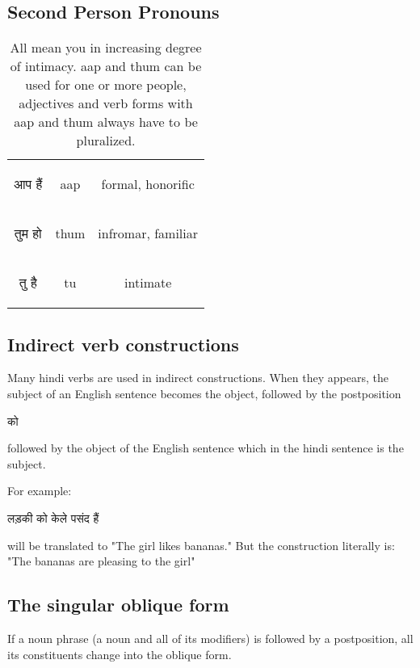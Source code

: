 \documentclass[12pt]{scrartcl}
\begin{document}
\subsection{Second Person Pronouns}

\begin{table}[H]
    \centering
    \begin{tabular}{c|c|c}
\begin{hindi}  आप हैं \end{hindi} & aap & formal, honorific \\
\begin{hindi}  तुम हो \end{hindi} & thum & infromar, familiar \\
\begin{hindi}  तु है \end{hindi} & tu & intimate \\         
    \end{tabular}
    \caption{All mean you in increasing degree of intimacy. aap and thum can be used  for one or more people, adjectives and verb forms with aap and thum always have to be pluralized. }
    \label{tab:second_person_pronouns}
\end{table}


\subsection{Indirect verb constructions}
Many hindi verbs are used in indirect constructions. When they appears, the subject of an English sentence becomes the object, followed by the postposition \begin{hindi} को  \end{hindi} followed by the object of the English sentence which in the  hindi sentence is the subject. 

For example:
\begin{hindi}
    लड़की को केले पसंद हैं
\end{hindi}
will be translated to 
"The girl likes bananas." 
But the construction literally is:
"The bananas are pleasing to the girl"

\subsection{The singular oblique form}
If a noun phrase (a noun and all of its modifiers) is followed by a postposition, all its constituents change into the oblique form. 
\end{document}

